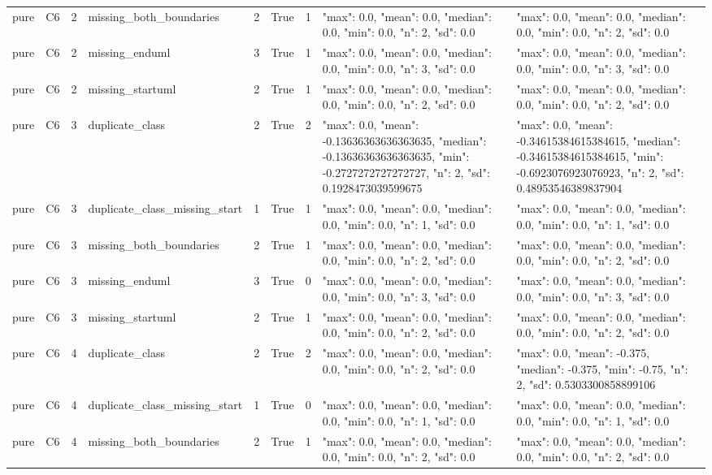\begin{tabular}{lllllllll}
pure & C6 & 2 & missing\_both\_boundaries & 2 & True & 1 & {"max": 0.0, "mean": 0.0, "median": 0.0, "min": 0.0, "n": 2, "sd": 0.0} & {"max": 0.0, "mean": 0.0, "median": 0.0, "min": 0.0, "n": 2, "sd": 0.0} \\
pure & C6 & 2 & missing\_enduml & 3 & True & 1 & {"max": 0.0, "mean": 0.0, "median": 0.0, "min": 0.0, "n": 3, "sd": 0.0} & {"max": 0.0, "mean": 0.0, "median": 0.0, "min": 0.0, "n": 3, "sd": 0.0} \\
pure & C6 & 2 & missing\_startuml & 2 & True & 1 & {"max": 0.0, "mean": 0.0, "median": 0.0, "min": 0.0, "n": 2, "sd": 0.0} & {"max": 0.0, "mean": 0.0, "median": 0.0, "min": 0.0, "n": 2, "sd": 0.0} \\
pure & C6 & 3 & duplicate\_class & 2 & True & 2 & {"max": 0.0, "mean": -0.13636363636363635, "median": -0.13636363636363635, "min": -0.2727272727272727, "n": 2, "sd": 0.1928473039599675} & {"max": 0.0, "mean": -0.34615384615384615, "median": -0.34615384615384615, "min": -0.6923076923076923, "n": 2, "sd": 0.48953546389837904} \\
pure & C6 & 3 & duplicate\_class\_missing\_start & 1 & True & 1 & {"max": 0.0, "mean": 0.0, "median": 0.0, "min": 0.0, "n": 1, "sd": 0.0} & {"max": 0.0, "mean": 0.0, "median": 0.0, "min": 0.0, "n": 1, "sd": 0.0} \\
pure & C6 & 3 & missing\_both\_boundaries & 2 & True & 1 & {"max": 0.0, "mean": 0.0, "median": 0.0, "min": 0.0, "n": 2, "sd": 0.0} & {"max": 0.0, "mean": 0.0, "median": 0.0, "min": 0.0, "n": 2, "sd": 0.0} \\
pure & C6 & 3 & missing\_enduml & 3 & True & 0 & {"max": 0.0, "mean": 0.0, "median": 0.0, "min": 0.0, "n": 3, "sd": 0.0} & {"max": 0.0, "mean": 0.0, "median": 0.0, "min": 0.0, "n": 3, "sd": 0.0} \\
pure & C6 & 3 & missing\_startuml & 2 & True & 1 & {"max": 0.0, "mean": 0.0, "median": 0.0, "min": 0.0, "n": 2, "sd": 0.0} & {"max": 0.0, "mean": 0.0, "median": 0.0, "min": 0.0, "n": 2, "sd": 0.0} \\
pure & C6 & 4 & duplicate\_class & 2 & True & 2 & {"max": 0.0, "mean": 0.0, "median": 0.0, "min": 0.0, "n": 2, "sd": 0.0} & {"max": 0.0, "mean": -0.375, "median": -0.375, "min": -0.75, "n": 2, "sd": 0.5303300858899106} \\
pure & C6 & 4 & duplicate\_class\_missing\_start & 1 & True & 0 & {"max": 0.0, "mean": 0.0, "median": 0.0, "min": 0.0, "n": 1, "sd": 0.0} & {"max": 0.0, "mean": 0.0, "median": 0.0, "min": 0.0, "n": 1, "sd": 0.0} \\
pure & C6 & 4 & missing\_both\_boundaries & 2 & True & 1 & {"max": 0.0, "mean": 0.0, "median": 0.0, "min": 0.0, "n": 2, "sd": 0.0} & {"max": 0.0, "mean": 0.0, "median": 0.0, "min": 0.0, "n": 2, "sd": 0.0} \\

\end{tabular}
